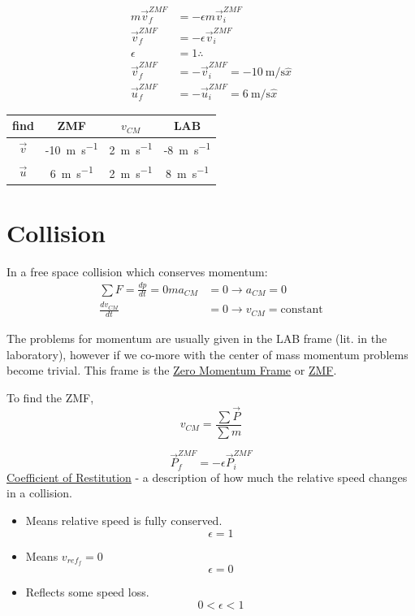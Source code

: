 \documentclass{article}
\begin{document}
\begin{enumerate}[label = \textbf{\arabic*)}]
		\begin{align*}
			m\vec{v}_f^{ZMF} & = -\epsilon m\vec{v}_i^{ZMF} \\
			\vec{v}_f^{ZMF} & = -\epsilon \vec{v}_i^{ZMF} \\
			\epsilon & = 1 \therefore \\
			\vec{v}_f^{ZMF} & = -\vec{v}_i^{ZMF} = -\SI{10}{\meter \per \second} \hat{x} \\
			\vec{u}_f^{ZMF} & = -\vec{u}_i^{ZMF} = \SI{6}{\meter \per \second} \hat{x}
		\end{align*}
		\begin{tabular}{| c | c | c | c |}
			\hline
			find & ZMF & $ v_{CM} $ & LAB \\
			\hline
			$ \vec{v} $ & -\SI{10}{\meter \per \second} & \SI{2}{\meter \per \second} & -\SI{8}{\meter \per \second} \\
			\hline
			$ \vec{u} $ & \SI{6}{\meter \per \second} & \SI{2}{\meter \per \second} & \SI{8}{\meter \per \second} \\
			\hline
		\end{tabular}
\end{enumerate}

\section{Collision}

In a free space collision which conserves momentum:
\begin{align*}
	\sum F = \frac{dp}{dt} = 0
	ma_{CM} & = 0 \rightarrow a_{CM} = 0 \\
	\frac{dv_{CM}}{dt} & = 0 \rightarrow v_{CM} = \text{constant}
\end{align*}

The problems for momentum are usually given in the LAB frame (lit. in the laboratory), however if we co-more with the center of mass momentum problems become trivial. This frame is the \underline{Zero Momentum Frame} or \underline{ZMF}.

To find the ZMF,
\begin{equation} v_{CM} = \frac{\sum \vec{P}}{\sum m} \end{equation}

\hr

\begin{equation}
	\vec{P}_f^{ZMF} = -\epsilon \vec{P}_i^{ZMF}
\end{equation}
\underline{Coefficient of Restitution} - a description of how much the relative speed changes in a collision.
\begin{itemize}
	\item Means relative speed is fully conserved.
		$$ \epsilon = 1 $$
	\item Means $ v_{ref_f} = 0 $
		$$ \epsilon = 0 $$
	\item Reflects some speed loss.
		$$ 0 < \epsilon < 1 $$
\end{itemize}
\end{document}
